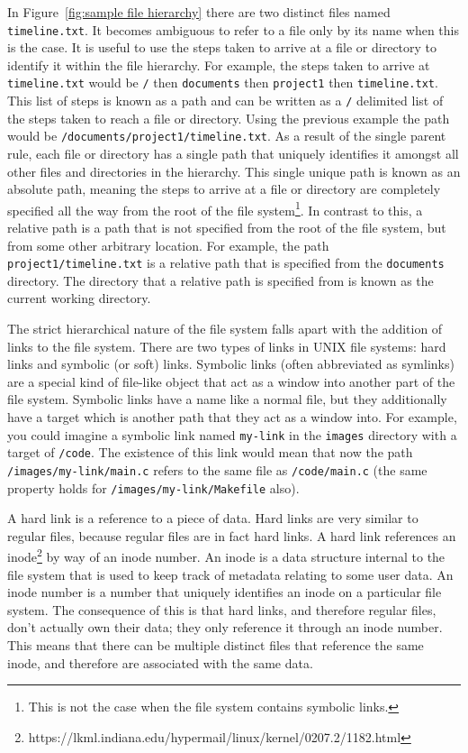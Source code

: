 In Figure~\ref{fig:sample file hierarchy} there are two distinct files named
\texttt{timeline.txt}. It becomes ambiguous to refer to a file only by its name
when this is the case. It is useful to use the steps taken to arrive at a file
or directory to identify it within the file hierarchy. For example, the steps
taken to arrive at \texttt{timeline.txt} would be \texttt{/} then
\texttt{documents} then \texttt{project1} then \texttt{timeline.txt}. This list
of steps is known as a path and can be written as a \texttt{/} delimited list
of the steps taken to reach a file or directory. Using the previous example the
path would be \texttt{/documents/project1/timeline.txt}. As a result of the
single parent rule, each file or directory has a single path that uniquely
identifies it amongst all other files and directories in the hierarchy. This
single unique path is known as an absolute path, meaning the steps to arrive at
a file or directory are completely specified all the way from the root of the
file system\footnote{This is not the case when the file system contains
symbolic links.}. In contrast to this, a relative path is a path that is not
specified from the root of the file system, but from some other arbitrary
location. For example, the path \texttt{project1/timeline.txt} is a relative
path that is specified from the \texttt{documents} directory. The directory
that a relative path is specified from is known as the current working
directory.

The strict hierarchical nature of the file system falls apart with the addition
of links to the file system. There are two types of links in UNIX file systems:
hard links and symbolic (or soft) links. Symbolic links (often abbreviated as
symlinks) are a special kind of file-like object that act as a window into
another part of the file system. Symbolic links have a name like a normal file,
but they additionally have a target which is another path that they act as a
window into. For example, you could imagine a symbolic link named
\texttt{my-link} in the \texttt{images} directory with a target of
\texttt{/code}. The existence of this link would mean that now the path
\texttt{/images/my-link/main.c} refers to the same file as
\texttt{/code/main.c} (the same property holds for
\texttt{/images/my-link/Makefile} also). 

A hard link is a reference to a piece of data. Hard links are very similar to
regular files, because regular files are in fact hard links. A hard link
references an inode\footnote{
https://lkml.indiana.edu/hypermail/linux/kernel/0207.2/1182.html} \cite{inode}
by way of an inode number. An inode is a data structure internal to the file
system that is used to keep track of metadata relating to some user data. An
inode number is a number that uniquely identifies an inode on a particular file
system. The consequence of this is that hard links, and therefore regular
files, don't actually own their data; they only reference it through an inode
number. This means that there can be multiple distinct files that reference the
same inode, and therefore are associated with the same data.

